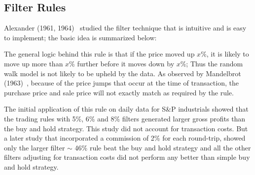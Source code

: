 \subsection{Filter Rules}


Alexander (1961, 1964)~\cite{alexander61,alexander64} studied the filter technique that is intuitive and is easy to implement; the basic idea is summarized below: \twomedskip


 \twomedskip


The general logic behind this rule is that if the price moved up $x$\%, it is likely to move up more than $x$\% further before it moves down by $x$\%; Thus the random walk model is not likely to be upheld by the data. As observed by Mandelbrot (1963)~\cite{mandelbrot}, because of the price jumps that occur at the time of transaction, the purchase price and sale price will not exactly match as required by the rule.


The initial application of this rule on daily data for S\&P industrials showed that the trading rules with 5\%, 6\% and 8\% filters generated larger gross profits than the buy and hold strategy. This study did not account for transaction costs. But a later study that incorporated a commission of 2\% for each round-trip, showed only the larger filter  $\sim$ 46\% rule beat the buy and hold strategy and all the other filters adjusting for transaction costs did not perform any better than simple buy and hold  strategy. 



